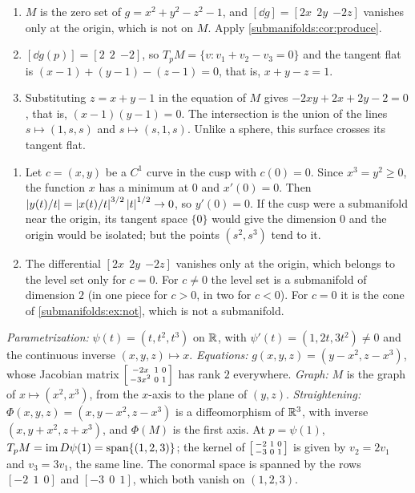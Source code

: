 \begin{enumerate}[nosep]
  \item $M$ is the zero set of $g = x^2 + y^2 - z^2 - 1$, and
        $[\dd g] = [2x\ \ 2y\ \ {-2z}]$ vanishes only at the origin, which
        is not on $M$. Apply \cref{submanifolds:cor:produce}.
  \item $[\dd g(p)] = [2\ \ 2\ \ {-2}]$, so
        $T_pM = \{v : v_1 + v_2 - v_3 = 0\}$ and the tangent flat is
        $(x - 1) + (y - 1) - (z - 1) = 0$, that is, $x + y - z = 1$.
  \item Substituting $z = x + y - 1$ in the equation of $M$ gives
        $-2xy + 2x + 2y - 2 = 0$, that is, $(x - 1)(y - 1) = 0$. The
        intersection is the union of the lines $s\mapsto(1, s, s)$ and
        $s\mapsto(s, 1, s)$. Unlike a sphere, this surface crosses its
        tangent flat.
\end{enumerate}

\begin{enumerate}[nosep]
  \item Let $c = (x, y)$ be a $C^1$ curve in the cusp with $c(0) = 0$.
        Since $x^3 = y^2\geq0$, the function $x$ has a minimum at $0$ and
        $x'(0) = 0$. Then
        $\left|y(t)/t\right| = \left|x(t)/t\right|^{3/2}\left|t\right|^{1/2}\to0$, so
        $y'(0) = 0$. If the cusp were a submanifold near the origin, its
        tangent space $\{0\}$ would give the dimension $0$ and the origin
        would be isolated; but the points $(s^2, s^3)$ tend to it.
  \item The differential $[2x\ \ 2y\ \ {-2z}]$ vanishes only at the
        origin, which belongs to the level set only for $c = 0$. For
        $c\neq0$ the level set is a submanifold of dimension $2$ (in one
        piece for $c > 0$, in two for $c < 0$). For $c = 0$ it is the
        cone of \cref{submanifolds:ex:not}, which is not a submanifold.
\end{enumerate}

\emph{Parametrization:} $\psi(t) = (t, t^2, t^3)$ on $\mathbb{R}$, with
$\psi'(t) = (1, 2t, 3t^2)\neq0$ and the continuous inverse
$(x, y, z)\mapsto x$. \emph{Equations:}
$g(x, y, z) = (y - x^2, z - x^3)$, whose Jacobian matrix
$\begin{bsmallmatrix}-2x & 1 & 0\\ -3x^2 & 0 & 1\end{bsmallmatrix}$ has
rank $2$ everywhere. \emph{Graph:} $M$ is the graph of
$x\mapsto(x^2, x^3)$, from the $x$-axis to the plane of $(y, z)$.
\emph{Straightening:} $\Phi(x, y, z) = (x, y - x^2, z - x^3)$ is a
diffeomorphism of $\mathbb{R}^3$, with inverse $(x, y + x^2, z + x^3)$, and
$\Phi(M)$ is the first axis. At $p = \psi(1)$,
$T_pM = \operatorname{im} D\psi(1) = \operatorname{span}\{(1, 2, 3)\}$; the kernel of
$\begin{bsmallmatrix}-2 & 1 & 0\\ -3 & 0 & 1\end{bsmallmatrix}$ is given
by $v_2 = 2v_1$ and $v_3 = 3v_1$, the same line. The conormal space is
spanned by the rows $[-2\ \ 1\ \ 0]$ and $[-3\ \ 0\ \ 1]$, which both
vanish on $(1, 2, 3)$.

